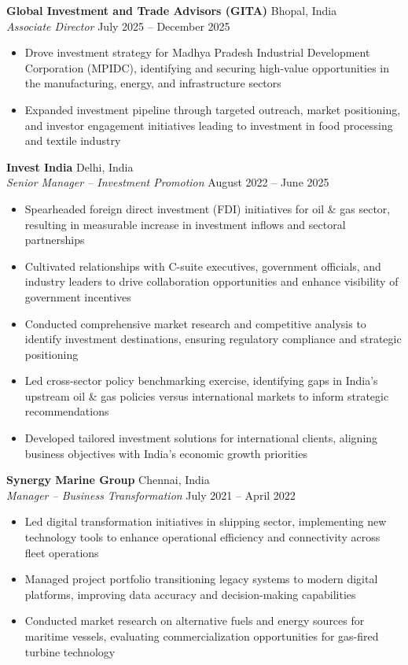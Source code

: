 \documentclass[10pt,a4paper]{article}
\begin{document}
\textbf{Global Investment and Trade Advisors (GITA)} \hfill Bhopal, India\\
\textit{Associate Director} \hfill July 2025 -- December 2025
\begin{itemize}
    \item Drove investment strategy for Madhya Pradesh Industrial Development Corporation (MPIDC), identifying and securing high-value opportunities in the manufacturing, energy, and infrastructure sectors
    \item Expanded investment pipeline through targeted outreach, market positioning, and investor engagement initiatives leading to investment in food processing and textile industry
\end{itemize}
\vspace{3pt}
\textbf{Invest India} \hfill Delhi, India\\
\textit{Senior Manager -- Investment Promotion} \hfill August 2022 -- June 2025
\begin{itemize}
    \item Spearheaded foreign direct investment (FDI) initiatives for oil \& gas sector, resulting in measurable increase in investment inflows and sectoral partnerships
    \item Cultivated relationships with C-suite executives, government officials, and industry leaders to drive collaboration opportunities and enhance visibility of government incentives
    \item Conducted comprehensive market research and competitive analysis to identify investment destinations, ensuring regulatory compliance and strategic positioning
    \item Led cross-sector policy benchmarking exercise, identifying gaps in India's upstream oil \& gas policies versus international markets to inform strategic recommendations
    \item Developed tailored investment solutions for international clients, aligning business objectives with India's economic growth priorities
\end{itemize}

\vspace{3pt}

\textbf{Synergy Marine Group} \hfill Chennai, India\\
\textit{Manager -- Business Transformation} \hfill July 2021 -- April 2022
\begin{itemize}
    \item Led digital transformation initiatives in shipping sector, implementing new technology tools to enhance operational efficiency and connectivity across fleet operations
    \item Managed project portfolio transitioning legacy systems to modern digital platforms, improving data accuracy and decision-making capabilities
    \item Conducted market research on alternative fuels and energy sources for maritime vessels, evaluating commercialization opportunities for gas-fired turbine technology
\end{itemize}
\end{document}
